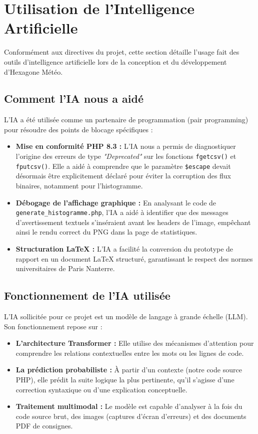 \documentclass[12pt,a4paper]{article}
\begin{document}
\vfill
{} \par
\newpage

\section{Utilisation de l'Intelligence Artificielle}

Conformément aux directives du projet, cette section détaille l'usage fait des outils d'intelligence artificielle lors de la conception et du développement d'Hexagone Météo.

\subsection{Comment l'IA nous a aidé}
L'IA a été utilisée comme un partenaire de programmation (pair programming) pour résoudre des points de blocage spécifiques :
\begin{itemize}
    \item \textbf{Mise en conformité PHP 8.3 :} L'IA nous a permis de diagnostiquer l'origine des erreurs de type \textit{"Deprecated"} sur les fonctions \texttt{fgetcsv()} et \texttt{fputcsv()}. Elle a aidé à comprendre que le paramètre \texttt{\$escape} devait désormais être explicitement déclaré pour éviter la corruption des flux binaires, notamment pour l'histogramme.
    \item \textbf{Débogage de l'affichage graphique :} En analysant le code de \texttt{generate\_histogramme.php}, l'IA a aidé à identifier que des messages d'avertissement textuels s'inséraient avant les headers de l'image, empêchant ainsi le rendu correct du PNG dans la page de statistiques.
    \item \textbf{Structuration LaTeX :} L'IA a facilité la conversion du prototype de rapport en un document LaTeX structuré, garantissant le respect des normes universitaires de Paris Nanterre.
\end{itemize}

\subsection{Fonctionnement de l'IA utilisée}
L'IA sollicitée pour ce projet est un modèle de langage à grande échelle (LLM). Son fonctionnement repose sur :
\begin{itemize}
    \item \textbf{L'architecture Transformer :} Elle utilise des mécanismes d'attention pour comprendre les relations contextuelles entre les mots ou les lignes de code.
    \item \textbf{La prédiction probabiliste :} À partir d'un contexte (notre code source PHP), elle prédit la suite logique la plus pertinente, qu'il s'agisse d'une correction syntaxique ou d'une explication conceptuelle.
    \item \textbf{Traitement multimodal :} Le modèle est capable d'analyser à la fois du code source brut, des images (captures d'écran d'erreurs) et des documents PDF de consignes.
\end{itemize}
\end{document}
